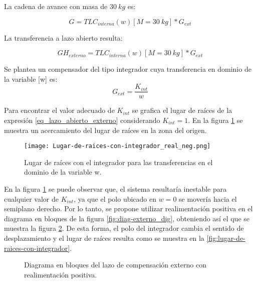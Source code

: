 \noindent La cadena de avance con masa de $30\:kg$ es:

\begin{equation} \label{eq_cadena_avance_integrador_dig}
	G=TLC_{interna}(w)[M=30\:kg]*G_{ext}
\end{equation}

La transferencia a lazo abierto resulta:

\begin{equation} \label{eq_lazo_abierto_externo_dig}
	GH_{externo}=TLC_{interna}(w)[M=30\:kg]*G_{ext}
\end{equation}

Se plantea un compensador del tipo integrador cuya transferencia en dominio de la variable [w] es:
\begin{equation}
	G_{ext}= \frac{K_{int}}{w}
\end{equation}


Para encontrar el valor adecuado de $K_{int}$ se grafica el lugar de raíces de la expresión \ref{eq_lazo_abierto_externo} considerando $K_{int}=1$. En la figura \ref{fig:lugar-de-raices-con-integrador_real_neg} se muestra un acercamiento del lugar de raíces en la zona del origen.


\begin{figure}[H]
	\centering
	\texttt{[image: Lugar-de-raices-con-integrador\_real\_neg.png]}
	\caption{Lugar de raíces con el integrador para las transferencias en el dominio de la variable w.}
	\label{fig:lugar-de-raices-con-integrador_real_neg}
\end{figure}

En la figura \ref{fig:lugar-de-raices-con-integrador_real_neg} se puede observar que, el sistema resultaría inestable para cualquier valor de $K_{int}$, ya que el polo ubicado en $w=0$ se movería hacia el semiplano derecho. Por lo tanto, se propone utilizar realimentación positiva en el diagrama en bloques de la figura \ref{fig:diag-externo_dig}, obteniendo así el que se muestra la figura \ref{fig:diag-externo_real_positiva_dig}. De esta forma, el polo del integrador cambia el sentido de desplazamiento y el lugar de raíces resulta como se muestra en la \ref{fig:lugar-de-raices-con-integrador}.


\begin{figure}[H]
	\centering
	
	\caption{Diagrama en bloques del lazo de compensación externo con realimentación positiva.}	
	\label{fig:diag-externo_real_positiva_dig}
\end{figure}

